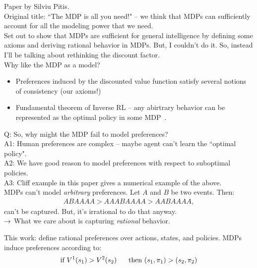 Paper by Silviu Pitis. \\

Original title: ``The MDP is all you need!" -- we think that MDPs can sufficiently account for all the modeling power that we need. \\

Set out to show that MDPs are sufficient for general intelligence by defining some axioms and deriving rational behavior in MDPs. But, I couldn't do it. So, instead I'll be talking about rethinking the discount factor. \\

Why like the MDP as a model?
\begin{itemize}
    \item Preferences induced by the discounted value function satisfy several notions of consistency (our axioms!)
    \item Fundamental theorem of Inverse RL -- any abirtrary behavior can be represented as the optimal policy in some MDP~\cite{ng2000algorithms}.
\end{itemize}

Q: So, why might the MDP fail to model preferences? \\

A1: Human preferences are complex -- maybe agent can't learn the ``optimal policy". \\

A2: We have good reason to model preferences with respect to suboptimal policies. \\

A3: Cliff example in this paper gives a numerical example of the above. \\

MDPs can't model {\it arbitrary} preferences. Let $A$ and $B$ be two events. Then:
\begin{align}
    ABAAAA > AAABAAAA  > AABAAAA,
\end{align}
can't be captured. But, it's irrational to do that anyway.\\

$\rightarrow$ What we care about is capturing {\it rational} behavior. \\


This work: define rational preferences over actions, states, and policies. MDPs induce preferences according to:
\[
\text{if  } V^1(s_1) > V^2(s_2)\hspace{6mm} \text{then } (s_1, \pi_1) > (s_2, \pi_2)
\]

